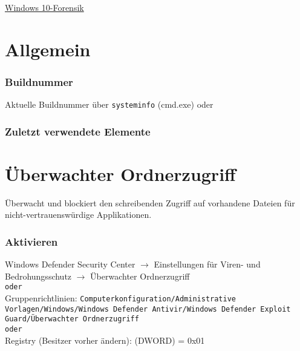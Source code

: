 \raggedright
\footnotesize
\begin{multicols}{3}	
	\setlength{\premulticols}{1pt}
	\setlength{\postmulticols}{1pt}
	\setlength{\multicolsep}{1pt}
	\setlength{\columnsep}{2pt}

\begin{center}
     \Large{\underline{Windows 10-Forensik}} \\
\end{center}

\section{Allgemein}

\subsubsection{Buildnummer}
Aktuelle Buildnummer über \texttt{systeminfo} (cmd.exe) oder 

\subsubsection{Zuletzt verwendete Elemente}

\section{Überwachter Ordnerzugriff}
Überwacht und blockiert den schreibenden Zugriff auf vorhandene Dateien für nicht-vertrauenswürdige Applikationen.


\subsubsection{Aktivieren}
Windows Defender Security Center $\rightarrow$ Einstellungen für Viren- und Bedrohungsschutz $\rightarrow$ Überwachter Ordnerzugriff\\
\texttt{oder}\\
Gruppenrichtlinien: \texttt{Computerkonfiguration/Administrative Vorlagen/Windows/Windows Defender Antivir/Windows Defender Exploit Guard/Überwachter Ordnerzugriff}\\
\texttt{oder}\\
Registry (Besitzer vorher ändern):  (DWORD) = 0x01


\end{multicols}
